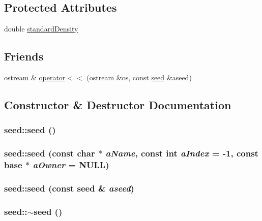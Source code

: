 \subsection*{Protected Attributes}
\begin{DoxyCompactItemize}
\item 
double \hyperlink{classseed_ab6eef1e64e6ab26e4d0fce13ff9c3e40}{standardDensity}
\end{DoxyCompactItemize}
\subsection*{Friends}
\begin{DoxyCompactItemize}
\item 
ostream \& \hyperlink{classseed_addebb9c9bc7ceb6fadd6d3a86be76168}{operator$<$$<$} (ostream \&os, const \hyperlink{classseed}{seed} \&aseed)
\end{DoxyCompactItemize}


\subsection{Constructor \& Destructor Documentation}
\hypertarget{classseed_a62b6981b66ef380c180afac5585ef00d}{
\subsubsection[{seed}]{\setlength{\rightskip}{0pt plus 5cm}seed::seed ()}}
\label{classseed_a62b6981b66ef380c180afac5585ef00d}
\hypertarget{classseed_a3301a5b3bcd3101215bcad5168ac3d29}{
\subsubsection[{seed}]{\setlength{\rightskip}{0pt plus 5cm}seed::seed (const char $\ast$ {\em aName}, \/  const int {\em aIndex} = {\ttfamily -\/1}, \/  const {\bf base} $\ast$ {\em aOwner} = {\ttfamily NULL})}}
\label{classseed_a3301a5b3bcd3101215bcad5168ac3d29}
\hypertarget{classseed_a91e6c864eb05fe0924e8e6d8392c2fbf}{
\subsubsection[{seed}]{\setlength{\rightskip}{0pt plus 5cm}seed::seed (const {\bf seed} \& {\em aseed})}}
\label{classseed_a91e6c864eb05fe0924e8e6d8392c2fbf}
\hypertarget{classseed_acab13d9e431a56786c8d4b7f50085ac8}{
\subsubsection[{$\sim$seed}]{\setlength{\rightskip}{0pt plus 5cm}seed::$\sim$seed ()}}
\label{classseed_acab13d9e431a56786c8d4b7f50085ac8}


